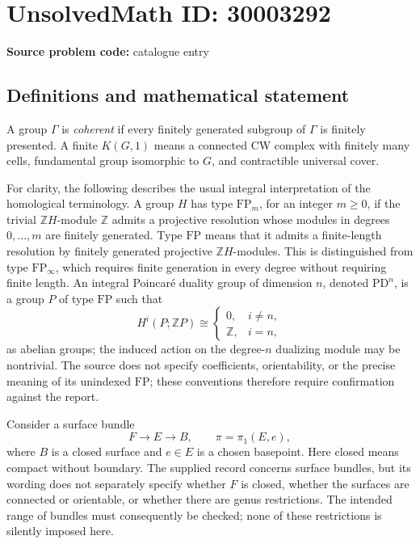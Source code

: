 \documentclass[11pt]{article}
\newcommand{\Z}{\mathbb{Z}}
\begin{document}
\section*{UnsolvedMath ID: 30003292}
\textbf{Source problem code:} catalogue entry
\subsection{Definitions and mathematical statement}
A group \(\Gamma\) is \emph{coherent} if every finitely generated subgroup of \(\Gamma\) is finitely presented. A finite \(K(G,1)\) means a connected CW complex with finitely many cells, fundamental group isomorphic to \(G\), and contractible universal cover.

For clarity, the following describes the usual integral interpretation of the homological terminology. A group \(H\) has type \(\mathrm{FP}_m\), for an integer \(m\geq 0\), if the trivial \(\Z H\)-module \(\Z\) admits a projective resolution whose modules in degrees \(0,\ldots,m\) are finitely generated. Type \(\mathrm{FP}\) means that it admits a finite-length resolution by finitely generated projective \(\Z H\)-modules. This is distinguished from type \(\mathrm{FP}_{\infty}\), which requires finite generation in every degree without requiring finite length. An integral Poincar\'e duality group of dimension \(n\), denoted \(\mathrm{PD}^n\), is a group \(P\) of type \(\mathrm{FP}\) such that
\[
H^i(P;\Z P)\cong
\begin{cases}
0,&i\neq n,\\
\Z,&i=n,
\end{cases}
\]
as abelian groups; the induced action on the degree-\(n\) dualizing module may be nontrivial. The source does not specify coefficients, orientability, or the precise meaning of its unindexed \(\mathrm{FP}\); these conventions therefore require confirmation against the report.

Consider a surface bundle
\[
F\longrightarrow E\longrightarrow B,
\qquad \pi=\pi_1(E,e),
\]
where \(B\) is a closed surface and \(e\in E\) is a chosen basepoint. Here closed means compact without boundary. The supplied record concerns surface bundles, but its wording does not separately specify whether \(F\) is closed, whether the surfaces are connected or orientable, or whether there are genus restrictions. The intended range of bundles must consequently be checked; none of these restrictions is silently imposed here.
\end{document}
